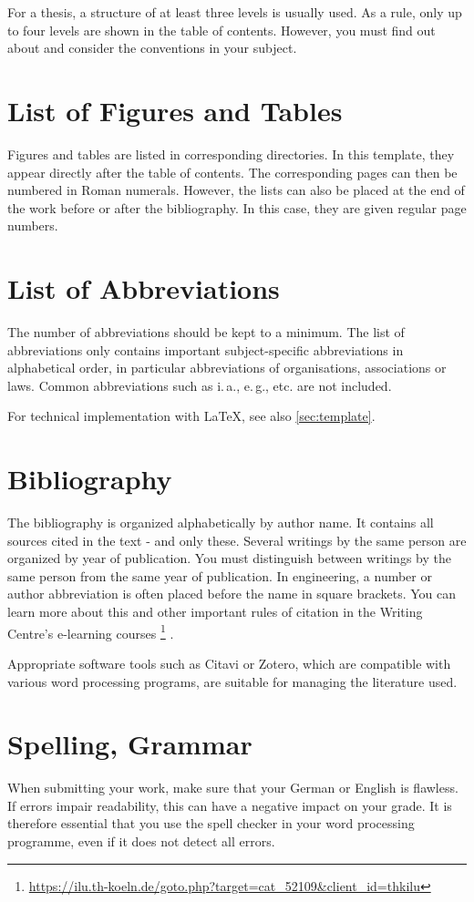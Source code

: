 For a thesis, a structure of at least three levels is usually used. As a rule, 
only up to four levels are shown in the table of contents. However, you must 
find out about and consider the conventions in your subject.

\section{List of Figures and Tables}
Figures and tables are listed in corresponding directories. In this template, 
they appear directly after the table of contents. The corresponding pages can 
then be numbered in Roman numerals. However, the lists can also be placed at 
the end of the work before or after the bibliography. In this case, they are 
given regular page numbers. 

\section{List of Abbreviations}
The number of abbreviations should be kept to a minimum. The list of 
abbreviations only contains important subject-specific abbreviations in 
alphabetical order, in particular abbreviations of organisations, associations 
or laws. Common abbreviations such as i.\,a., e.\,g., etc. are not included.

For technical implementation with \LaTeX, see also \cref{sec:template}.

\section{Bibliography}
The bibliography is organized alphabetically by author name. It contains all 
sources cited in the text - and only these. Several writings by the same person 
are organized by year of publication. You must distinguish between writings by 
the same person from the same year of publication. In engineering, a number or 
author abbreviation is often placed before the name in square brackets. You can 
learn more about this and other important rules of citation in the Writing 
Centre's e-learning courses%
\footnote{\href{https://ilu.th-koeln.de/goto.php?target=cat\_52109\&client\_id=thkilu}{https://ilu.th-koeln.de/goto.php?target=cat\_52109\&client\_id=thkilu}}%
.

Appropriate software tools such as Citavi or Zotero, which are compatible with 
various word processing programs, are suitable for managing the literature 
used.

\section{Spelling, Grammar}
When submitting your work, make sure that your German or English is flawless. 
If errors impair readability, this can have a negative impact on your grade. It 
is therefore essential that you use the spell checker in your word processing 
programme, even if it does not detect all errors.

